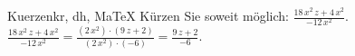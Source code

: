 \begin{MAufgabe}{Kuerzen}{kr, dh, MaTeX}
K\"urzen Sie soweit m\"oglich: $\frac{18\, x^2\, z + 4\, x^2}{- 12\, x^2}$.\\ 
\ifLsg\MLoesung
\quad $\frac{18\, x^2\, z + 4\, x^2}{- 12\, x^2}=\frac{(2\, x^2)\cdot(9\, z + 2)}{(2\, x^2)\cdot(-6)}=\frac{9\, z + 2}{-6}$.\else\relax\fi
 \end{MAufgabe}